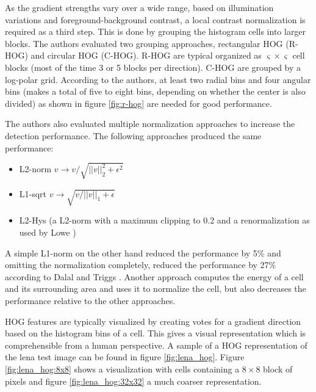 As the gradient strengths vary over a wide range, based on illumination variations and foreground-background contrast, a local contrast normalization is required as a third step. This is done by grouping the histogram cells into larger blocks. The authors evaluated two grouping approaches, rectangular HOG (\acs{R-HOG}) and circular HOG (\acs{C-HOG}). \acs{R-HOG} are typical organized as $\varsigma \times \varsigma$ cell blocks (most of the time 3 or 5 blocks per direction). \acs{C-HOG} are grouped by a log-polar grid. According to the authors, at least two radial bins and four angular bins (makes a total of five to eight bins, depending on whether the center is also divided) as shown in figure \ref{fig:r-hog} are needed for good performance.



The authors also evaluated multiple normalization approaches to increase the detection performance.
The following approaches produced the same performance:
\begin{itemize}
	\item L2-norm $v \rightarrow v / \sqrt{||v||_2^2 + \epsilon^2}$
	\item L1-sqrt $v \rightarrow \sqrt{v / ||v||_1 + \epsilon}$
	\item L2-Hys (a L2-norm with a maximum clipping to 0.2 and a renormalization as used by Lowe \cite{Lowe2004})
\end{itemize}
A simple L1-norm on the other hand reduced the performance by 5\% and omitting the normalization completely, reduced the performance by 27\% according to Dalal and Triggs \cite{Dalal2005}. Another approach computes the energy of a cell and its surrounding area and uses it to normalize the cell, but also decreases the performance relative to the other approaches.

\ac{HOG} features are typically visualized by creating votes for a gradient direction based on the histogram bins of a cell. This gives a visual representation which is comprehensible from a human perspective. A sample of a \ac{HOG} representation of the lena test image can be found in figure \ref{fig:lena_hog}. Figure \ref{fig:lena_hog:8x8} shows a visualization with cells containing a $8\times8$ block of pixels and figure \ref{fig:lena_hog:32x32} a much coarser representation.

